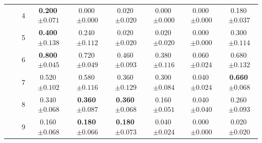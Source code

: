 \begin{longtable}{lllcccccc}
 &  & 4 & \textbf{0.200}$\,{\scriptstyle\pm0.071}$ & 0.000$\,{\scriptstyle\pm0.000}$ & 0.020$\,{\scriptstyle\pm0.020}$ & 0.000$\,{\scriptstyle\pm0.000}$ & 0.000$\,{\scriptstyle\pm0.000}$ & 0.180$\,{\scriptstyle\pm0.037}$ \\
 &  & 5 & \textbf{0.400}$\,{\scriptstyle\pm0.138}$ & 0.240$\,{\scriptstyle\pm0.112}$ & 0.020$\,{\scriptstyle\pm0.020}$ & 0.020$\,{\scriptstyle\pm0.020}$ & 0.000$\,{\scriptstyle\pm0.000}$ & 0.300$\,{\scriptstyle\pm0.114}$ \\
 &  & 6 & \textbf{0.800}$\,{\scriptstyle\pm0.045}$ & 0.720$\,{\scriptstyle\pm0.049}$ & 0.460$\,{\scriptstyle\pm0.093}$ & 0.380$\,{\scriptstyle\pm0.116}$ & 0.060$\,{\scriptstyle\pm0.024}$ & 0.680$\,{\scriptstyle\pm0.132}$ \\
 &  & 7 & 0.520$\,{\scriptstyle\pm0.102}$ & 0.580$\,{\scriptstyle\pm0.116}$ & 0.360$\,{\scriptstyle\pm0.129}$ & 0.300$\,{\scriptstyle\pm0.084}$ & 0.040$\,{\scriptstyle\pm0.024}$ & \textbf{0.660}$\,{\scriptstyle\pm0.068}$ \\
 &  & 8 & 0.340$\,{\scriptstyle\pm0.068}$ & \textbf{0.360}$\,{\scriptstyle\pm0.087}$ & \textbf{0.360}$\,{\scriptstyle\pm0.068}$ & 0.160$\,{\scriptstyle\pm0.051}$ & 0.040$\,{\scriptstyle\pm0.040}$ & 0.260$\,{\scriptstyle\pm0.093}$ \\
 &  & 9 & 0.160$\,{\scriptstyle\pm0.068}$ & \textbf{0.180}$\,{\scriptstyle\pm0.066}$ & \textbf{0.180}$\,{\scriptstyle\pm0.073}$ & 0.040$\,{\scriptstyle\pm0.024}$ & 0.000$\,{\scriptstyle\pm0.000}$ & 0.020$\,{\scriptstyle\pm0.020}$ \\
\end{longtable}
\endgroup

